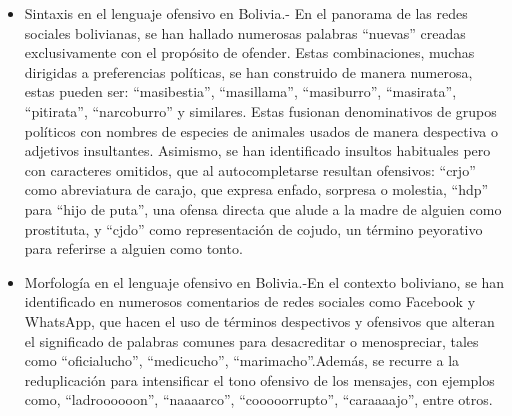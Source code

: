 \begin{itemize}
	\item Sintaxis en el lenguaje ofensivo en Bolivia.- En el panorama de las redes sociales bolivianas, se han hallado numerosas palabras ``nuevas'' creadas exclusivamente con el propósito de ofender. Estas combinaciones, muchas dirigidas a preferencias políticas, se han construido de manera numerosa, estas pueden ser: ``masibestia'', ``masillama'', ``masiburro'', ``masirata'', ``pitirata'', ``narcoburro'' y similares. Estas fusionan denominativos de grupos políticos con nombres de especies de animales usados de manera despectiva o adjetivos insultantes. Asimismo, se han identificado insultos habituales pero con caracteres omitidos, que al autocompletarse resultan ofensivos: ``crjo'' como abreviatura de carajo, que expresa enfado, sorpresa o molestia, ``hdp'' para ``hijo de puta'', una ofensa directa que alude a la madre de alguien como prostituta, y ``cjdo'' como representación de cojudo, un término peyorativo para referirse a alguien como tonto.
	
	\item Morfología en el lenguaje ofensivo en Bolivia.-En el contexto boliviano, se han identificado en numerosos comentarios de redes sociales como Facebook y WhatsApp, que hacen el uso de términos despectivos y ofensivos que alteran el significado de palabras comunes para desacreditar o menospreciar, tales como ``oficialucho'', ``medicucho'', ``marimacho''.Además, se recurre a la reduplicación para intensificar el tono ofensivo de los mensajes, con ejemplos como, ``ladroooooon'', ``naaaarco'', ``cooooorrupto'', ``caraaaajo'', entre otros.
\end{itemize}